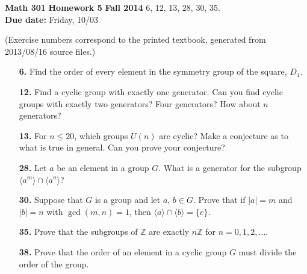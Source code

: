 \documentclass[12pt,reqno]{amsart}
\begin{document}
\thispagestyle{empty}

\noindent \textbf{Math 301} \hskip5cm {\bf Homework 5} \hfill {\bf Fall 2014}
\vskip1cm
  6, 12, 13, 28, 30, 35.\\  
{\bf Due date:} Friday, 10/03

\medskip

\noindent (Exercise numbers correspond to the printed textbook, generated from 2013/08/16 source files.)

\medskip

\begin{enumerate}

\item[{\bf 6.}]
Find the order of every element in the symmetry group of the square,
$D_4$.

\vskip10cm

\item[{\bf 12.}]
Find a cyclic group with exactly one generator.  Can you find cyclic
groups with exactly two generators?  Four generators?  How about $n$
generators?

\newpage

\item[{\bf 13.}]
For $n \leq 20$, which groups $U(n)$ are cyclic?  Make a conjecture as
to what is true in general.  Can you prove your conjecture?  

\vskip12cm
\item[{\bf 28.}]
Let $a$ be an element in a group $G$. What is a generator for the
subgroup $\langle a^m \rangle  \cap  \langle a^n \rangle $?
 
\newpage

\item[{\bf 30.}]
Suppose that $G$ is a group and let $a$, $b \in G$. Prove that if $|a|
= m$ and $|b| = n$ with $\gcd(m,n) = 1$, then $\langle a \rangle  \cap
\langle b \rangle  = \{ e \}$. 
 
\vskip12cm
\item[{\bf 35.}]
Prove that the subgroups of ${\mathbb Z}$ are exactly $n{\mathbb Z}$ for $n
= 0, 1, 2, \ldots$. 

\newpage

\item[{\bf 38.}]
Prove that the order of an element in a cyclic group $G$ must divide
the order of the  group. 

\end{enumerate}
\end{document}
